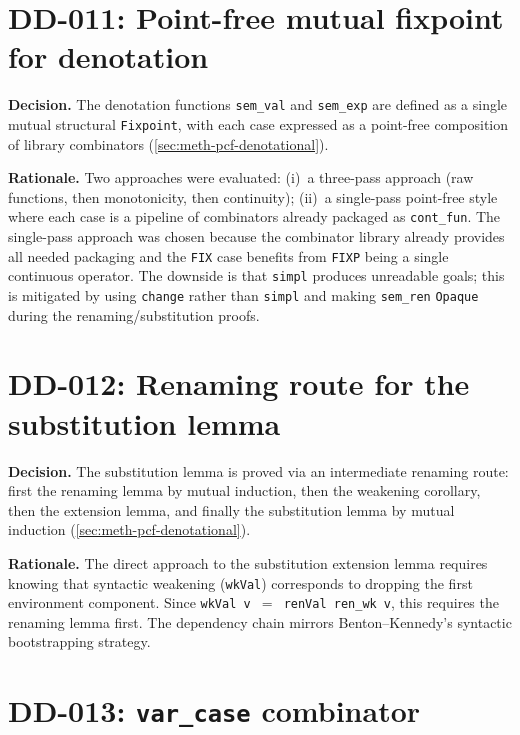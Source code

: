 \section*{DD-011: Point-free mutual fixpoint for denotation}

\textbf{Decision.}
The denotation functions \texttt{sem\_val} and \texttt{sem\_exp} are
defined as a single mutual structural \texttt{Fixpoint}, with each case
expressed as a point-free composition of library combinators
(\cref{sec:meth-pcf-denotational}).

\textbf{Rationale.}
Two approaches were evaluated: (i)~a three-pass approach (raw functions,
then monotonicity, then continuity); (ii)~a single-pass point-free
style where each case is a pipeline of combinators already packaged as
\texttt{cont\_fun}.  The single-pass approach was chosen because the
combinator library already provides all needed packaging and the
\texttt{FIX} case benefits from \texttt{FIXP} being a single continuous
operator.  The downside is that \texttt{simpl} produces unreadable
goals; this is mitigated by using \texttt{change} rather than
\texttt{simpl} and making \texttt{sem\_ren} \texttt{Opaque} during the
renaming/substitution proofs.

\section*{DD-012: Renaming route for the substitution lemma}

\textbf{Decision.}
The substitution lemma is proved via an intermediate renaming route:
first the renaming lemma by mutual induction, then the weakening
corollary, then the extension lemma, and finally the substitution
lemma by mutual induction (\cref{sec:meth-pcf-denotational}).

\textbf{Rationale.}
The direct approach to the substitution extension lemma requires knowing
that syntactic weakening (\texttt{wkVal}) corresponds to dropping the
first environment component.  Since \texttt{wkVal\,v $=$ renVal\,ren\_wk\,v},
this requires the renaming lemma first.  The dependency chain mirrors
Benton--Kennedy's syntactic bootstrapping strategy.

\section*{DD-013: \texttt{var\_case} combinator}

